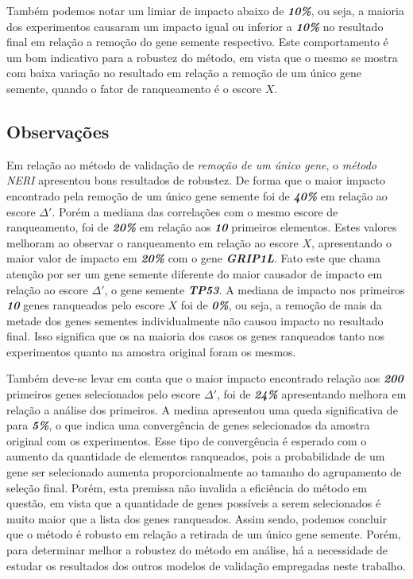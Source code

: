 Também podemos notar um limiar de impacto abaixo de \textsl{\textbf{10\%}}, ou seja, a maioria dos experimentos causaram um impacto igual ou inferior a \textsl{\textbf{10\%}} no resultado final em relação a remoção do gene semente respectivo. Este comportamento é um bom indicativo para a robustez do método, em vista que o mesmo se mostra com baixa variação no resultado em relação a remoção de um único gene semente, quando o fator de ranqueamento é o escore $X$.

%
%
%
%
\subsection{Observações}
%
Em relação ao método de validação de \textit{remoção de um único gene}, o \textit{método NERI} apresentou bons resultados de robustez. De forma que o maior impacto encontrado pela remoção de um único gene semente foi de \textit{\textbf{40\%}} em relação ao escore $\Delta'$. Porém  a mediana das correlações com o mesmo escore de ranqueamento, foi de \textit{\textbf{20\%}} em relação aos \textbf{\textit{10}} primeiros elementos. Estes valores melhoram ao observar o ranqueamento em relação ao escore $X$, apresentando o maior valor de impacto em \textsl{\textbf{20\%}} com o gene \textsl{\textbf{GRIP1L}}. Fato este que chama atenção por ser um gene semente diferente do maior causador de impacto em relação ao escore $\Delta'$, o gene semente \textsl{\textbf{TP53}}. A mediana de impacto nos primeiros \textsl{\textbf{10}} genes ranqueados pelo escore $X$ foi de \textsl{\textbf{0\%}}, ou seja, a remoção de mais da metade dos genes sementes individualmente não causou impacto no resultado final. Isso significa que os na maioria dos casos os genes ranqueados tanto nos experimentos quanto na amostra original foram os mesmos.

%
%

Também deve-se levar em conta que o maior impacto encontrado relação aos \textbf{\textit{200}} primeiros genes selecionados pelo escore $\Delta'$, foi de \textbf{\textit{24\%}} apresentando melhora em relação a análise dos \textbf{} primeiros. A medina apresentou uma queda significativa de \textbf{} para \textbf{\textit{5\%}}, o que indica uma convergência de genes selecionados da amostra original com os experimentos. Esse tipo de convergência é esperado com o aumento da quantidade de elementos ranqueados, pois a probabilidade de um gene ser selecionado aumenta proporcionalmente ao tamanho do agrupamento de seleção final. Porém, esta premissa não invalida a eficiência do método em questão, em vista que a quantidade de genes possíveis a serem selecionados é muito maior que a lista dos genes ranqueados.
%
Assim sendo, podemos concluir que o método é robusto em relação a retirada de um único gene semente. Porém, para determinar melhor a robustez do método em análise, há a necessidade de estudar os resultados dos outros modelos de validação empregadas neste trabalho.
%
%
%
%
